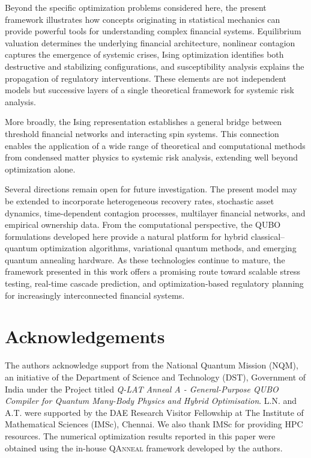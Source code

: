 \documentclass[aps,reprint,superscriptaddress,pra]{revtex4-2}
\begin{document}
Beyond the specific optimization problems considered here, the present framework illustrates how concepts originating in statistical mechanics can provide powerful tools for understanding complex financial systems. Equilibrium valuation determines the underlying financial architecture, nonlinear contagion captures the emergence of systemic crises, Ising optimization identifies both destructive and stabilizing configurations, and susceptibility analysis explains the propagation of regulatory interventions. These elements are not independent models but successive layers of a single theoretical framework for systemic risk analysis.

More broadly, the Ising representation establishes a general bridge between threshold financial networks and interacting spin systems. This connection enables the application of a wide range of theoretical and computational methods from condensed matter physics to systemic risk analysis, extending well beyond optimization alone.

Several directions remain open for future investigation. The present model may be extended to incorporate heterogeneous recovery rates, stochastic asset dynamics, time-dependent contagion processes, multilayer financial networks, and empirical ownership data. From the computational perspective, the QUBO formulations developed here provide a natural platform for hybrid classical--quantum optimization algorithms, variational quantum methods, and emerging quantum annealing hardware. As these technologies continue to mature, the framework presented in this work offers a promising route toward scalable stress testing, real-time cascade prediction, and optimization-based regulatory planning for increasingly interconnected financial systems.

\section{Acknowledgements}

The authors acknowledge support from the National Quantum Mission (NQM), an initiative of the Department of Science and Technology (DST), Government of India under the Project titled \emph{Q-LAT Anneal A - General-Purpose QUBO Compiler for Quantum Many-Body Physics and
Hybrid Optimisation}.
L.N. and A.T. were supported by the DAE Research Visitor Fellowship at The Institute of Mathematical Sciences (IMSc), Chennai. We also thank IMSc for providing HPC resources.
The numerical optimization results reported in this paper were obtained using the in-house \textsc{QAnneal} framework developed by the authors.
\end{document}

